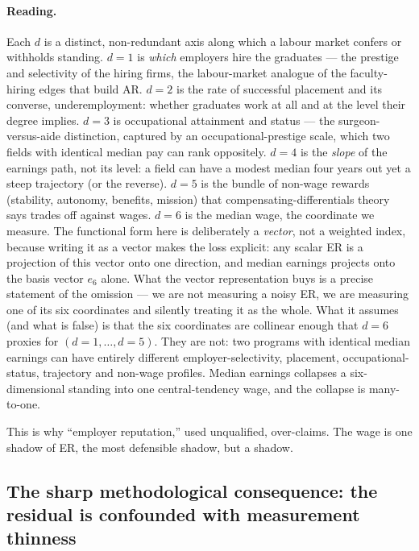 \documentclass[11pt]{article}
\begin{document}
\paragraph{Reading.} Each $d$ is a distinct, non-redundant axis along which a labour market confers or withholds standing. $d=1$ is \emph{which} employers hire the graduates --- the prestige and selectivity of the hiring firms, the labour-market analogue of the faculty-hiring edges that build AR. $d=2$ is the rate of successful placement and its converse, underemployment: whether graduates work at all and at the level their degree implies. $d=3$ is occupational attainment and status --- the surgeon-versus-aide distinction, captured by an occupational-prestige scale, which two fields with identical median pay can rank oppositely. $d=4$ is the \emph{slope} of the earnings path, not its level: a field can have a modest median four years out yet a steep trajectory (or the reverse). $d=5$ is the bundle of non-wage rewards (stability, autonomy, benefits, mission) that compensating-differentials theory says trades off against wages. $d=6$ is the median wage, the coordinate we measure. The functional form here is deliberately a \emph{vector}, not a weighted index, because writing it as a vector makes the loss explicit: any scalar ER is a projection of this vector onto one direction, and median earnings projects onto the basis vector $e_6$ alone. What the vector representation buys is a precise statement of the omission --- we are not measuring a noisy ER, we are measuring one of its six coordinates and silently treating it as the whole. What it assumes (and what is false) is that the six coordinates are collinear enough that $d=6$ proxies for $(d{=}1,\dots,d{=}5)$. They are not: two programs with identical median earnings can have entirely different employer-selectivity, placement, occupational-status, trajectory and non-wage profiles. Median earnings collapses a six-dimensional standing into one central-tendency wage, and the collapse is many-to-one.

This is why ``employer reputation,'' used unqualified, over-claims. The wage is one shadow of ER, the most defensible shadow, but a shadow.

\subsection{The sharp methodological consequence: the residual is confounded with measurement thinness}
\end{document}
